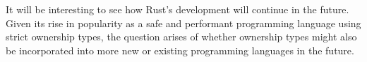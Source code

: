 \documentclass[sigplan,11pt,nonacm]{acmart}
\begin{document}
It will be interesting to see how Rust's development will continue in the future.
Given its rise in popularity as a safe and performant programming language using strict ownership types, the question arises of whether ownership types might also be incorporated into more new or existing programming languages in the future.



\end{document}
